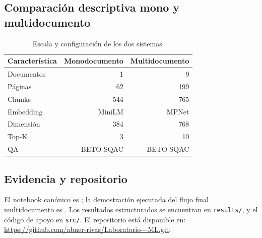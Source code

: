 \documentclass[12pt,letterpaper]{article}
\begin{document}
\subsection{Comparación descriptiva mono y multidocumento}

\begin{table}[!htbp]
\centering
\small
\caption{Escala y configuración de los dos sistemas.}
\begin{tabular}{@{}lrr@{}}
\toprule
\textbf{Característica} & \textbf{Monodocumento} & \textbf{Multidocumento}\\
\midrule
Documentos & 1 & 9\\
Páginas & 62 & 199\\
Chunks & 544 & 765\\
Embedding & MiniLM & MPNet\\
Dimensión & 384 & 768\\
Top-K & 3 & 10\\
QA & BETO-SQAC & BETO-SQAC\\
\bottomrule
\end{tabular}
\end{table}

\subsection{Evidencia y repositorio}

El notebook canónico es ; la demostración ejecutada
del flujo final multidocumento es . Los resultados estructurados
se encuentran en \texttt{results/}, y el código de apoyo en \texttt{src/}. El
repositorio está disponible en:
\url{https://github.com/abner-rivas/Laboratorio---ML.git}.

\label{fin-documento}
\end{document}
